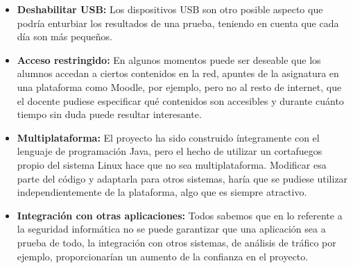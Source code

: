 \begin{itemize}

    \item {\bfseries Deshabilitar USB:} Los dispositivos USB son otro posible aspecto que podría enturbiar los resultados de una prueba, teniendo en cuenta que cada día son más pequeños.

    \item {\bfseries Acceso restringido:} En algunos momentos puede ser deseable que los alumnos accedan a ciertos contenidos en la red, apuntes de la asignatura en una plataforma como Moodle, por ejemplo, pero no al resto de internet, que el docente pudiese especificar qué contenidos son accesibles y durante cuánto tiempo sin duda puede resultar interesante.

    \item {\bfseries Multiplataforma:} El proyecto ha sido construido íntegramente con el lenguaje de programación Java, pero el hecho de utilizar un cortafuegos propio del sistema Linux hace que no sea multiplataforma. Modificar esa parte del código y adaptarla para otros sistemas, haría que se pudiese utilizar independientemente de la plataforma, algo que es siempre atractivo.

    \item {\bfseries Integración con otras aplicaciones:} Todos sabemos que en lo referente a la seguridad informática no se puede garantizar que una aplicación sea a prueba de todo, la integración con otros sistemas, de análisis de tráfico por ejemplo, proporcionarían un aumento de la confianza en el proyecto.

\end{itemize} 